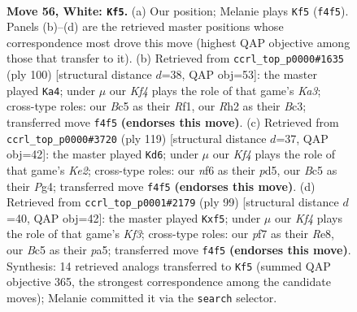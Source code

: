 \documentclass[11pt]{article}
\begin{document}
\clearpage

\begin{figure}[p]\centering
\begin{subfigure}{0.46\textwidth}\centering
\resizebox{\linewidth}{!}{%
\newchessgame
\chessboard[
  setfen={7k/5p2/5n2/2B5/p3pK1p/P6P/3r1P1R/8 w - - 12 56},
  showmover=false,
  pgfstyle=straightmove, color=movearrow, markmove={f4-f5}
]}
\caption{}
\end{subfigure}\hfill
\begin{subfigure}{0.46\textwidth}\centering
\resizebox{\linewidth}{!}{%
\newchessgame
\chessboard[
  setfen={8/k4p2/5b2/1P1p1p2/3P1p2/K1B2P1r/1P6/5R2 w - - 5 51},
  showmover=false,
  pgfstyle=straightmove, color=movearrow, markmove={a3-a4}
]}
\caption{}
\end{subfigure}
\\[4pt]
\begin{subfigure}{0.46\textwidth}\centering
\resizebox{\linewidth}{!}{%
\newchessgame
\chessboard[
  setfen={8/4k3/4P3/3P4/r5p1/4K1Pp/p6P/R7 b - - 0 60},
  showmover=false,
  pgfstyle=straightmove, color=movearrow, markmove={e7-d6}
]}
\caption{}
\end{subfigure}\hfill
\begin{subfigure}{0.46\textwidth}\centering
\resizebox{\linewidth}{!}{%
\newchessgame
\chessboard[
  setfen={4r3/8/1Rp2k1p/P1Nb1PpP/3P4/8/5K2/8 b - - 0 50},
  showmover=false,
  pgfstyle=straightmove, color=movearrow, markmove={f6-f5}
]}
\caption{}
\end{subfigure}
\caption{\textbf{Move 56, White: \texttt{Kf5}.} (a) Our position; Melanie plays \texttt{Kf5} (\texttt{f4f5}). Panels (b)--(d) are the retrieved master positions whose correspondence most drove this move (highest QAP objective among those that transfer to it). (b) Retrieved from \texttt{ccrl\_top\_p0000\#1635} (ply 100) [structural distance $d$=38, QAP obj=53]: the master played \texttt{Ka4}; under $\mu$ our \emph{Kf4} plays the role of that game's \emph{Ka3}; cross-type roles: our \emph{B}c5 as their \emph{R}f1, our \emph{R}h2 as their \emph{B}c3; transferred move \texttt{f4f5} \textbf{(endorses this move)}. (c) Retrieved from \texttt{ccrl\_top\_p0000\#3720} (ply 119) [structural distance $d$=37, QAP obj=42]: the master played \texttt{Kd6}; under $\mu$ our \emph{Kf4} plays the role of that game's \emph{Ke2}; cross-type roles: our \emph{n}f6 as their \emph{p}d5, our \emph{B}c5 as their \emph{P}g4; transferred move \texttt{f4f5} \textbf{(endorses this move)}. (d) Retrieved from \texttt{ccrl\_top\_p0001\#2179} (ply 99) [structural distance $d$=40, QAP obj=42]: the master played \texttt{Kxf5}; under $\mu$ our \emph{Kf4} plays the role of that game's \emph{Kf3}; cross-type roles: our \emph{p}f7 as their \emph{R}e8, our \emph{B}c5 as their \emph{p}a5; transferred move \texttt{f4f5} \textbf{(endorses this move)}. Synthesis: 14 retrieved analogs transferred to \texttt{Kf5} (summed QAP objective 365, the strongest correspondence among the candidate moves); Melanie committed it via the \texttt{search} selector.}
\label{fig:thought-m110}
\end{figure}
\end{document}
